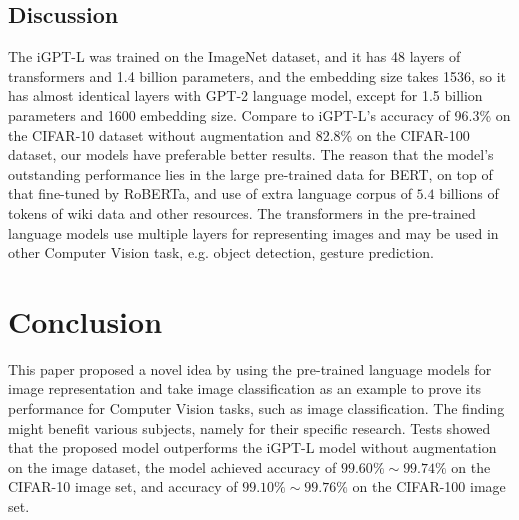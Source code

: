 \documentclass[runningheads]{llncs}
\begin{document}
\subsection{Discussion}

The iGPT-L was trained on the ImageNet dataset, and it has 48 layers of transformers and 1.4 billion parameters, and the embedding size takes 1536,
so it has almost identical layers with GPT-2 language model, except for 1.5 billion parameters and 1600 embedding size.
Compare to iGPT-L's accuracy of 96.3\% on the CIFAR-10 dataset without augmentation and 82.8\% on the CIFAR-100 dataset, our models have preferable better results.
The reason that the model's outstanding performance lies in the large pre-trained data for BERT, on top of that fine-tuned by RoBERTa, and use of extra language corpus of
$5.4$ billions of tokens of wiki data and other resources.
The transformers in the pre-trained language models use multiple layers for representing images and may be used in other Computer Vision task, e.g. object detection, gesture prediction.


\section{Conclusion}

 This paper proposed a novel idea by using the pre-trained language models for image representation and take image classification
 as an example to prove its performance for Computer Vision tasks, such as image classification.
 The finding might benefit various subjects, namely  for their specific research.
Tests showed that the proposed model outperforms the iGPT-L model without augmentation on the image dataset,
the model achieved accuracy of $99.60\%\sim99.74\%$ on the CIFAR-10 image set,
and accuracy of $99.10\%\sim99.76\%$ on the CIFAR-100 image set.


%
%
%
% 
% 
%
{\small



}
\end{document}
